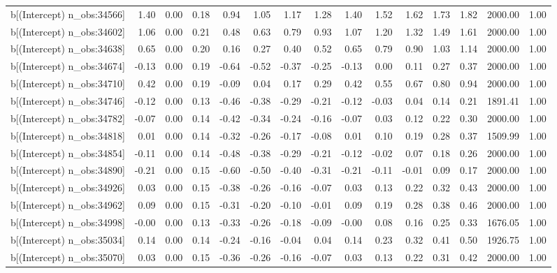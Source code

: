 \begin{table}[ht]
\begin{tabular}{rrrrrrrrrrrrrrr}
  b[(Intercept) n\_obs:34566] & 1.40 & 0.00 & 0.18 & 0.94 & 1.05 & 1.17 & 1.28 & 1.40 & 1.52 & 1.62 & 1.73 & 1.82 & 2000.00 & 1.00 \\ 
  b[(Intercept) n\_obs:34602] & 1.06 & 0.00 & 0.21 & 0.48 & 0.63 & 0.79 & 0.93 & 1.07 & 1.20 & 1.32 & 1.49 & 1.61 & 2000.00 & 1.00 \\ 
  b[(Intercept) n\_obs:34638] & 0.65 & 0.00 & 0.20 & 0.16 & 0.27 & 0.40 & 0.52 & 0.65 & 0.79 & 0.90 & 1.03 & 1.14 & 2000.00 & 1.00 \\ 
  b[(Intercept) n\_obs:34674] & -0.13 & 0.00 & 0.19 & -0.64 & -0.52 & -0.37 & -0.25 & -0.13 & 0.00 & 0.11 & 0.27 & 0.37 & 2000.00 & 1.00 \\ 
  b[(Intercept) n\_obs:34710] & 0.42 & 0.00 & 0.19 & -0.09 & 0.04 & 0.17 & 0.29 & 0.42 & 0.55 & 0.67 & 0.80 & 0.94 & 2000.00 & 1.00 \\ 
  b[(Intercept) n\_obs:34746] & -0.12 & 0.00 & 0.13 & -0.46 & -0.38 & -0.29 & -0.21 & -0.12 & -0.03 & 0.04 & 0.14 & 0.21 & 1891.41 & 1.00 \\ 
  b[(Intercept) n\_obs:34782] & -0.07 & 0.00 & 0.14 & -0.42 & -0.34 & -0.24 & -0.16 & -0.07 & 0.03 & 0.12 & 0.22 & 0.30 & 2000.00 & 1.00 \\ 
  b[(Intercept) n\_obs:34818] & 0.01 & 0.00 & 0.14 & -0.32 & -0.26 & -0.17 & -0.08 & 0.01 & 0.10 & 0.19 & 0.28 & 0.37 & 1509.99 & 1.00 \\ 
  b[(Intercept) n\_obs:34854] & -0.11 & 0.00 & 0.14 & -0.48 & -0.38 & -0.29 & -0.21 & -0.12 & -0.02 & 0.07 & 0.18 & 0.26 & 2000.00 & 1.00 \\ 
  b[(Intercept) n\_obs:34890] & -0.21 & 0.00 & 0.15 & -0.60 & -0.50 & -0.40 & -0.31 & -0.21 & -0.11 & -0.01 & 0.09 & 0.17 & 2000.00 & 1.00 \\ 
  b[(Intercept) n\_obs:34926] & 0.03 & 0.00 & 0.15 & -0.38 & -0.26 & -0.16 & -0.07 & 0.03 & 0.13 & 0.22 & 0.32 & 0.43 & 2000.00 & 1.00 \\ 
  b[(Intercept) n\_obs:34962] & 0.09 & 0.00 & 0.15 & -0.31 & -0.20 & -0.10 & -0.01 & 0.09 & 0.19 & 0.28 & 0.38 & 0.46 & 2000.00 & 1.00 \\ 
  b[(Intercept) n\_obs:34998] & -0.00 & 0.00 & 0.13 & -0.33 & -0.26 & -0.18 & -0.09 & -0.00 & 0.08 & 0.16 & 0.25 & 0.33 & 1676.05 & 1.00 \\ 
  b[(Intercept) n\_obs:35034] & 0.14 & 0.00 & 0.14 & -0.24 & -0.16 & -0.04 & 0.04 & 0.14 & 0.23 & 0.32 & 0.41 & 0.50 & 1926.75 & 1.00 \\ 
  b[(Intercept) n\_obs:35070] & 0.03 & 0.00 & 0.15 & -0.36 & -0.26 & -0.16 & -0.07 & 0.03 & 0.13 & 0.22 & 0.31 & 0.42 & 2000.00 & 1.00 \\ 

\end{tabular}
\end{table}
